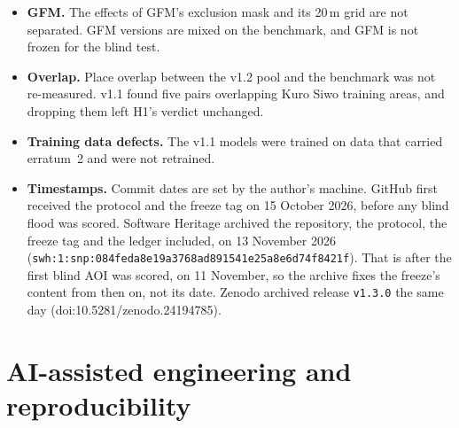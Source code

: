 \documentclass[10pt,twocolumn,a4paper]{article}
\newcommand{\file}[1]{\nolinkurl{#1}}
\begin{document}
\begin{itemize}
    applies to both families equally, by design.
  \item \textbf{GFM.} The effects of GFM's exclusion mask and its 20\,m grid are not separated. GFM versions are mixed
    on the benchmark, and GFM is not frozen for the blind test.
  \item \textbf{Overlap.} Place overlap between the v1.2 pool and the benchmark was not re-measured. v1.1 found five
    pairs overlapping Kuro Siwo training areas, and dropping them left H1's verdict unchanged.
  \item \textbf{Training data defects.} The v1.1 models were trained on data that carried erratum~2 and were not
    retrained.
  \item \textbf{Timestamps.} Commit dates are set by the author's machine. GitHub first received the protocol and the
    freeze tag on 15 October 2026, before any blind flood was scored. Software Heritage archived the repository,
    the protocol, the freeze tag and the ledger included, on 13 November 2026
    (\file{swh:1:snp:084feda8e19a3768ad891541e25a8e6d74f8421f}). That is after the first blind AOI was scored, on
    11 November, so the archive fixes the freeze's content from then on, not its date. Zenodo archived release
    \texttt{v1.3.0} the same day (doi:10.5281/zenodo.24194785).
\end{itemize}

\section{AI-assisted engineering and reproducibility}\label{sec:ai}
\end{document}
